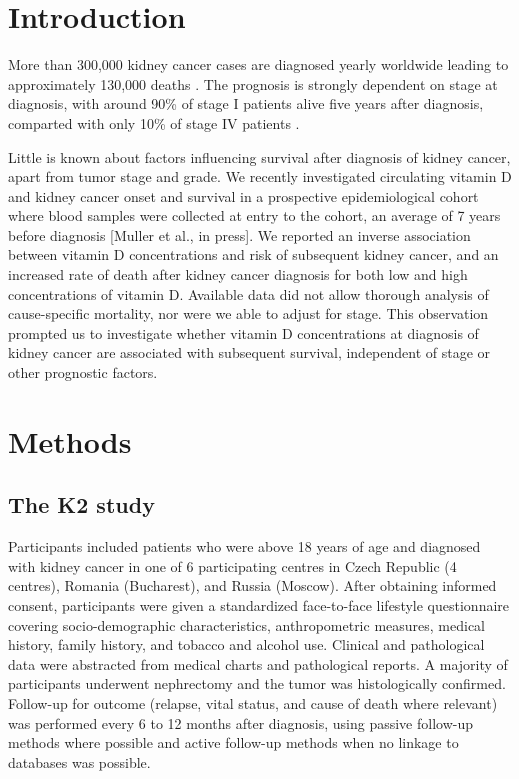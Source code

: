 \documentclass[a4paper,11pt]{article}
\begin{document}
\clearpage


\section*{Introduction}
More than 300,000 kidney cancer cases are diagnosed yearly worldwide leading to 
approximately 130,000 deaths \cite{ferlay_cancer_2013}. The prognosis is 
strongly dependent on stage at diagnosis, with around 90\% of stage I patients 
alive five years after diagnosis, comparted with only 10\% of stage IV patients 
\cite{CRUK_kidney_2014}.

Little is known about factors influencing survival after diagnosis of kidney 
cancer, apart from tumor stage and grade. We recently investigated circulating 
vitamin D and kidney cancer onset and survival in a prospective epidemiological 
cohort where blood samples were collected at entry to the cohort, an average 
of 7 years before diagnosis [Muller et al., in press]. We reported an inverse 
association between vitamin D concentrations and risk of subsequent kidney 
cancer, and an increased rate of death after kidney cancer diagnosis for both 
low and high concentrations of vitamin D. Available data did not allow thorough 
analysis of cause-specific mortality, nor were we able to adjust for stage. This 
observation prompted us to investigate whether vitamin D concentrations at  
diagnosis of kidney cancer are associated with subsequent survival, independent 
of stage or other prognostic factors.   

\section*{Methods}
\subsection*{The K2 study}
Participants included patients who were above 18 years of age and diagnosed 
with kidney cancer in one of 6 participating centres in Czech Republic (4 
centres), Romania (Bucharest), and Russia (Moscow). After obtaining informed 
consent, participants were given a standardized face-to-face lifestyle 
questionnaire covering socio-demographic characteristics, anthropometric 
measures, medical history, family history, and tobacco and alcohol use. 
Clinical and pathological data were abstracted from medical charts and 
pathological reports. A majority of participants underwent nephrectomy and the 
tumor was histologically confirmed. Follow-up for outcome (relapse, vital 
status, and cause of death where relevant) was performed every 6 to 12 months 
after diagnosis, using passive follow-up methods where possible and active 
follow-up methods when no linkage to databases was possible.
\end{document}
